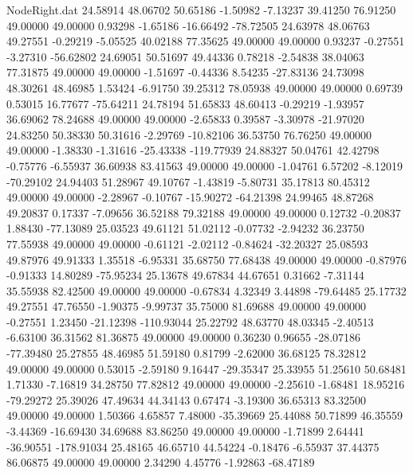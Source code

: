 \begin{filecontents}{NodeRight.dat}
  24.58914   48.06702   50.65186    -1.50982   -7.13237   39.41250   76.91250   49.00000   49.00000    0.93298   -1.65186  -16.66492  -78.72505
  24.63978   48.06763   49.27551    -0.29219   -5.05525   40.02188   77.35625   49.00000   49.00000    0.93237   -0.27551   -3.27310  -56.62802
  24.69051   50.51697   49.44336     0.78218   -2.54838   38.04063   77.31875   49.00000   49.00000   -1.51697   -0.44336    8.54235  -27.83136
  24.73098   48.30261   48.46985     1.53424   -6.91750   39.25312   78.05938   49.00000   49.00000    0.69739    0.53015   16.77677  -75.64211
  24.78194   51.65833   48.60413    -0.29219   -1.93957   36.69062   78.24688   49.00000   49.00000   -2.65833    0.39587   -3.30978  -21.97020
  24.83250   50.38330   50.31616    -2.29769  -10.82106   36.53750   76.76250   49.00000   49.00000   -1.38330   -1.31616  -25.43338 -119.77939
  24.88327   50.04761   42.42798    -0.75776   -6.55937   36.60938   83.41563   49.00000   49.00000   -1.04761    6.57202   -8.12019  -70.29102
  24.94403   51.28967   49.10767    -1.43819   -5.80731   35.17813   80.45312   49.00000   49.00000   -2.28967   -0.10767  -15.90272  -64.21398
  24.99465   48.87268   49.20837     0.17337   -7.09656   36.52188   79.32188   49.00000   49.00000    0.12732   -0.20837    1.88430  -77.13089
  25.03523   49.61121   51.02112    -0.07732   -2.94232   36.23750   77.55938   49.00000   49.00000   -0.61121   -2.02112   -0.84624  -32.20327
  25.08593   49.87976   49.91333     1.35518   -6.95331   35.68750   77.68438   49.00000   49.00000   -0.87976   -0.91333   14.80289  -75.95234
  25.13678   49.67834   44.67651     0.31662   -7.31144   35.55938   82.42500   49.00000   49.00000   -0.67834    4.32349    3.44898  -79.64485
  25.17732   49.27551   47.76550    -1.90375   -9.99737   35.75000   81.69688   49.00000   49.00000   -0.27551    1.23450  -21.12398 -110.93044
  25.22792   48.63770   48.03345    -2.40513   -6.63100   36.31562   81.36875   49.00000   49.00000    0.36230    0.96655  -28.07186  -77.39480
  25.27855   48.46985   51.59180     0.81799   -2.62000   36.68125   78.32812   49.00000   49.00000    0.53015   -2.59180    9.16447  -29.35347
  25.33955   51.25610   50.68481     1.71330   -7.16819   34.28750   77.82812   49.00000   49.00000   -2.25610   -1.68481   18.95216  -79.29272
  25.39026   47.49634   44.34143     0.67474   -3.19300   36.65313   83.32500   49.00000   49.00000    1.50366    4.65857    7.48000  -35.39669
  25.44088   50.71899   46.35559    -3.44369  -16.69430   34.69688   83.86250   49.00000   49.00000   -1.71899    2.64441  -36.90551 -178.91034
  25.48165   46.65710   44.54224    -0.18476   -6.55937   37.44375   86.06875   49.00000   49.00000    2.34290    4.45776   -1.92863  -68.47189

\end{filecontents}
